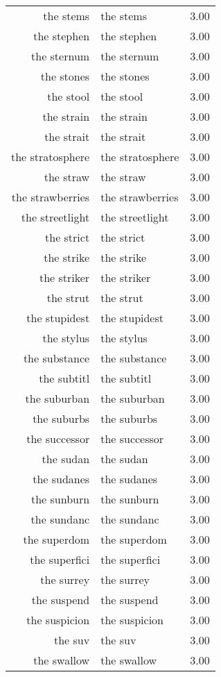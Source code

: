 \begin{table}[ht]
\begin{tabular}{rlr}
  the stems & the stems & 3.00 \\ 
  the stephen & the stephen & 3.00 \\ 
  the sternum & the sternum & 3.00 \\ 
  the stones & the stones & 3.00 \\ 
  the stool & the stool & 3.00 \\ 
  the strain & the strain & 3.00 \\ 
  the strait & the strait & 3.00 \\ 
  the stratosphere & the stratosphere & 3.00 \\ 
  the straw & the straw & 3.00 \\ 
  the strawberries & the strawberries & 3.00 \\ 
  the streetlight & the streetlight & 3.00 \\ 
  the strict & the strict & 3.00 \\ 
  the strike & the strike & 3.00 \\ 
  the striker & the striker & 3.00 \\ 
  the strut & the strut & 3.00 \\ 
  the stupidest & the stupidest & 3.00 \\ 
  the stylus & the stylus & 3.00 \\ 
  the substance & the substance & 3.00 \\ 
  the subtitl & the subtitl & 3.00 \\ 
  the suburban & the suburban & 3.00 \\ 
  the suburbs & the suburbs & 3.00 \\ 
  the successor & the successor & 3.00 \\ 
  the sudan & the sudan & 3.00 \\ 
  the sudanes & the sudanes & 3.00 \\ 
  the sunburn & the sunburn & 3.00 \\ 
  the sundanc & the sundanc & 3.00 \\ 
  the superdom & the superdom & 3.00 \\ 
  the superfici & the superfici & 3.00 \\ 
  the surrey & the surrey & 3.00 \\ 
  the suspend & the suspend & 3.00 \\ 
  the suspicion & the suspicion & 3.00 \\ 
  the suv & the suv & 3.00 \\ 
  the swallow & the swallow & 3.00 \\ 

\end{tabular}
\end{table}
